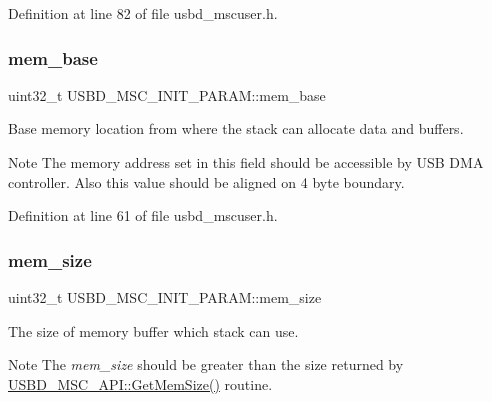 Definition at line 82 of file usbd\+\_\+mscuser.\+h.

\mbox{\label{struct_u_s_b_d___m_s_c___i_n_i_t___p_a_r_a_m_a1ab6b66d44ad7db8c2ded5e2f4200aae}} 
\subsubsection{\texorpdfstring{mem\+\_\+base}{mem\_base}}
{\footnotesize\ttfamily uint32\+\_\+t U\+S\+B\+D\+\_\+\+M\+S\+C\+\_\+\+I\+N\+I\+T\+\_\+\+P\+A\+R\+A\+M\+::mem\+\_\+base}

Base memory location from where the stack can allocate data and buffers. \begin{DoxyNote}{Note}
The memory address set in this field should be accessible by U\+SB D\+MA controller. Also this value should be aligned on 4 byte boundary. 
\end{DoxyNote}


Definition at line 61 of file usbd\+\_\+mscuser.\+h.

\mbox{\label{struct_u_s_b_d___m_s_c___i_n_i_t___p_a_r_a_m_a33048544944f306ae198de18468309b4}} 
\subsubsection{\texorpdfstring{mem\+\_\+size}{mem\_size}}
{\footnotesize\ttfamily uint32\+\_\+t U\+S\+B\+D\+\_\+\+M\+S\+C\+\_\+\+I\+N\+I\+T\+\_\+\+P\+A\+R\+A\+M\+::mem\+\_\+size}

The size of memory buffer which stack can use. \begin{DoxyNote}{Note}
The {\itshape mem\+\_\+size} should be greater than the size returned by \hyperlink{struct_u_s_b_d___m_s_c___a_p_i_a73a9d240b20fcd83e6d2c9675420d626}{U\+S\+B\+D\+\_\+\+M\+S\+C\+\_\+\+A\+P\+I\+::\+Get\+Mem\+Size()} routine. 
\end{DoxyNote}



